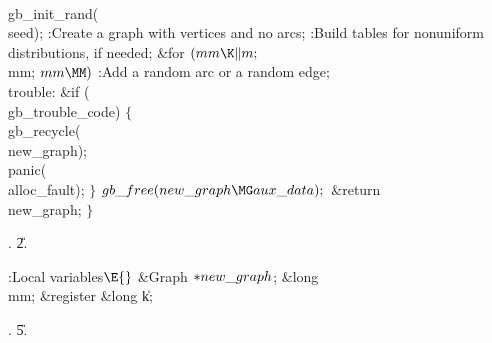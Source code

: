 \\{gb\_init\_rand}(\\{seed});\6
:Create a graph with  vertices and no arcs\X;\6
:Build tables for nonuniform distributions, if needed\X;\6
\&{for} ${}(\\{mm}\K\|m;{}$ \\{mm}; ${}\\{mm}\MM){}$\1\5
:Add a random arc or a random edge\X;\2\6
\4\\{trouble}:\6
\&{if} (\\{gb\_trouble\_code})\5
${}\{{}$\1\6
\\{gb\_recycle}(\\{new\_graph});\6
\\{panic}(\\{alloc\_fault});\6
\4${}\}{}$\2\6
${}\\{gb\_free}(\\{new\_graph}\MG\\{aux\_data});{}$\6
\&{return} \\{new\_graph};\6
\4${}\}{}$\2\par
{}.
\U2.\fi

\B{}:Local variables\X${}\E{}$\6
\&{Graph} ${}{*}\\{new\_graph}{}$;\6
\&{long} \\{mm};\6
\&{register} \&{long} \|k;\par
{}.
\U5.\fi

